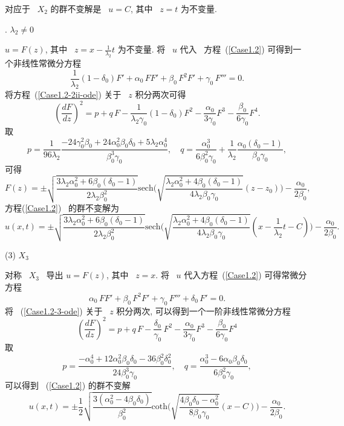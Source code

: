 对应于~ $X_2$ 的群不变解是~ $u=C$, 其中~ $z=t$ 为不变量.

\lowercase\expandafter{}. $\lambda_2\neq0$

$u=F(z)$, 其中~ $z=x-\frac{1}{\lambda_2}t$ 为不变量. 将~ $u$ 代入~ 方程~(\ref{Case1.2}) 可得到一个非线性常微分方程
\begin{equation}\label{Case1.2-2ii-ode}
\frac{1}{\lambda_2}(1-\delta_0)F'+\alpha_0\,FF'+\beta_0\,F^2F'+\gamma_0\,F'''=0.
\end{equation}
将方程~(\ref{Case1.2-2ii-ode}) 关于~ $z$ 积分两次可得
\begin{equation}
(\frac{d F}{d z})^2=p+q\,F-\frac{1}{\lambda_2\gamma_0}(1-\delta_0)F^2
-\frac{\alpha_0}{3\gamma_0}F^3-\frac{\beta_0}{6\gamma_0}F^4.
\end{equation}
取$$p=\frac{1}{96\lambda_2}\frac{-24\gamma_0^2\beta_0+24\alpha_0^2\beta_0\delta_0+5\lambda_2\alpha_0^4}{\beta_0^3\gamma_0}, \quad q=\frac{\alpha_0^3}{6\beta_0^2\gamma_0}+\frac{1}{\lambda_2}\frac{\alpha_0(\delta_0-1)}{\beta_0\gamma_0},$$
可得
$$F(z)=\pm\sqrt{\frac{3\lambda_2\alpha_0^2+6\beta_0(\delta_0-1)}{2\lambda_2\beta_0^2}}\text{sech}\big(\sqrt{\frac{\lambda_2\alpha_0^2+4\beta_0(\delta_0-1)}{4\lambda_2\beta_0\gamma_0}}(z-z_0)\big)-\frac{\alpha_0}{2\beta_0},$$
方程(\ref{Case1.2})~ 的群不变解为
$$u(x,t)=\pm\sqrt{\frac{3\lambda_2\alpha_0^2+6\beta_0(\delta_0-1)}{2\lambda_2\beta_0^2}}
\text{sech}\big(\sqrt{\frac{\lambda_2\alpha_0^2+4\beta_0(\delta_0-1)}{4\lambda_2\beta_0\gamma_0}}
(x-\frac{1}{\lambda_2}t-C)\big)-\frac{\alpha_0}{2\beta_0}.$$


\noindent(3) $X_3$

对称~ $X_3$ ~导出 $u=F(z)$, 其中~ $z=x$. 将~ $u$ 代入方程~(\ref{Case1.2}) 可得常微分方程
\begin{equation}\label{Case1.2-3-ode}
\alpha_0\,FF'+\beta_0\,F^2F'+\gamma_0\,F'''+\delta_0\,F'=0.
\end{equation}
将~ (\ref{Case1.2-3-ode}) 关于~ $z$ 积分两次, 可以得到一个一阶非线性常微分方程
\begin{equation}
(\frac{d F}{d z})^2=p+q\,F-\frac{\delta_0}{\gamma_0}\,F^2
-\frac{\alpha_0}{3\gamma_0}F^3-\frac{\beta_0}{6\gamma_0}F^4
\end{equation}
取~ $$p=\frac{-\alpha_0^4+12 \alpha_0^2 \beta_0 \delta_0-36 \beta_0^2 \delta_0^2}{24 \beta_0^3 \gamma_0},\quad q=\frac{\alpha_0^3-6\alpha_0\beta_0\delta_0}{6\beta_0^2\gamma_0},$$
可以得到~ (\ref{Case1.2}) 的群不变解
$$u(x,t)=\pm\frac{1}{2} \sqrt{\frac{3(\alpha_0^2-4\beta_0\delta_0)}{\beta_0^2}}\text{coth}
\big(\sqrt{\frac{4\beta_0\delta_0-\alpha_0^2}{8\beta_0\gamma_0}}(x-C)\big)
-\frac{\alpha_0}{2\beta_0}.$$



